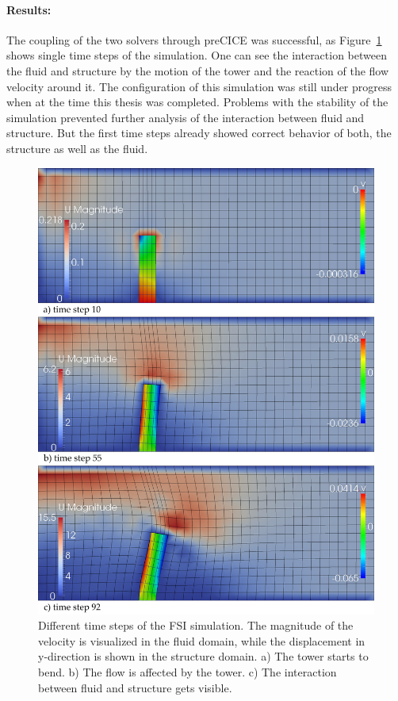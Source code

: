  \paragraph{Results:} The coupling of the two solvers through preCICE was successful, as Figure~\ref{fig:testI1} shows single time steps of the simulation. One can see the interaction between the fluid and structure by the motion of the tower and the reaction of the flow velocity around it. The configuration of this simulation was still under progress when at the time this thesis was completed. Problems with the stability of the simulation prevented further analysis of the interaction between fluid and structure. But the first time steps already showed correct behavior of both, the structure as well as the fluid.
  \begin{figure}
   \centering
   \includegraphics[width=0.9\linewidth]{figures/fsi_frames.png}
   \caption{Different time steps of the FSI simulation. The magnitude of the velocity is visualized in the fluid domain, while the displacement in y-direction is shown in the structure domain. a) The tower starts to bend. b) The flow is affected by the tower. c) The interaction between fluid and structure gets visible.}
   \label{fig:testI1}
  \end{figure}
  